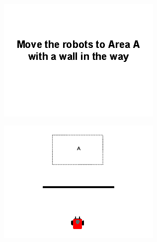 \begin{figure}
	\centering
	\begin{subfigure}{0.4\textwidth}
		\includegraphics[width=\linewidth]{../ui_experiment/slide_images/Swarm_Robot_Control_-_10_Robot_0004.png}
	\end{subfigure}
	\begin{subfigure}{0.4\textwidth}
		\includegraphics[width=\linewidth]{../ui_experiment/slide_images/Swarm_Robot_Control_-_Single_Robot_0005.png}
	\end{subfigure}
	\begin{subfigure}{0.4\textwidth}

\end{subfigure}
\end{figure}
